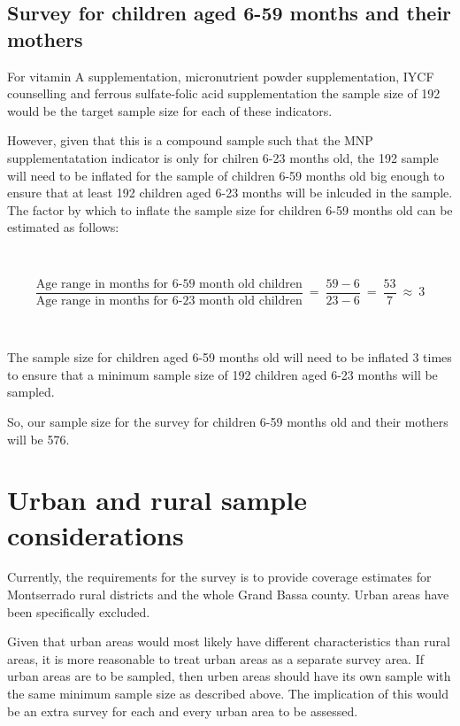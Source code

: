 \documentclass[12pt,a4paper]{book}
\theoremstyle{definition}
\theoremstyle{definition}
\theoremstyle{definition}
\theoremstyle{remark}
\begin{document}
\hypertarget{survey-for-children-aged-6-59-months-and-their-mothers}{%
\subsection{Survey for children aged 6-59 months and their
mothers}\label{survey-for-children-aged-6-59-months-and-their-mothers}}

For vitamin A supplementation, micronutrient powder supplementation,
IYCF counselling and ferrous sulfate-folic acid supplementation the
sample size of 192 would be the target sample size for each of these
indicators.

However, given that this is a compound sample such that the MNP
supplementatation indicator is only for chilren 6-23 months old, the 192
sample will need to be inflated for the sample of children 6-59 months
old big enough to ensure that at least 192 children aged 6-23 months
will be inlcuded in the sample. The factor by which to inflate the
sample size for children 6-59 months old can be estimated as follows:

~

\[ \frac{\text{Age range in months for 6-59 month old children}}{\text{Age range in months for 6-23 month old children}} ~ = ~ \frac{59 - 6}{23 - 6} ~ = ~ \frac{53}{7} ~ \approx ~ 3 \]

~

The sample size for children aged 6-59 months old will need to be
inflated 3 times to ensure that a minimum sample size of 192 children
aged 6-23 months will be sampled.

So, our sample size for the survey for children 6-59 months old and
their mothers will be 576.

\hypertarget{urbanrural}{%
\section{Urban and rural sample considerations}\label{urbanrural}}

Currently, the requirements for the survey is to provide coverage
estimates for Montserrado rural districts and the whole Grand Bassa
county. Urban areas have been specifically excluded.

Given that urban areas would most likely have different characteristics
than rural areas, it is more reasonable to treat urban areas as a
separate survey area. If urban areas are to be sampled, then urben areas
should have its own sample with the same minimum sample size as
described above. The implication of this would be an extra survey for
each and every urban area to be assessed.
\end{document}
